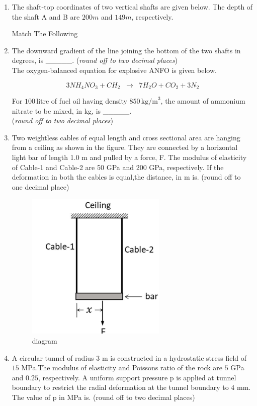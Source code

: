 \documentclass[journal,12pt,onecolumn]{IEEEtran}
\theoremstyle{remark}
\begin{document}
\begin{enumerate}
\hfill{}
\item The shaft-top coordinates of two vertical shafts are given below. The depth of the shaft A and B are $200 m$ and $149 m$, respectively.
\begin{table}[H]
  \centering
  \caption{Match The Following}
  
  \label{tab:table9}
\end{table}

\hfill{}
\item The downward gradient of the line joining the bottom of the two shafts in degrees, is \_\_\_\_\_. 
(\textit{round off to two decimal places}) \\[2em]


The oxygen-balanced equation for explosive ANFO is given below.  

\[
3NH_4NO_3 + CH_2 \;\; \rightarrow \;\; 7H_2O + CO_2 + 3N_2
\]

For $100 \, \text{litre}$ of fuel oil having density $850 \, \text{kg/m}^3$, the amount of ammonium nitrate 
to be mixed, in kg, is \_\_\_\_\_. \\
(\textit{round off to two decimal places})


\hfill{}
\item Two weightless cables of equal length and cross sectional area are hanging from a
ceiling as shown in the figure. They are connected by a horizontal light bar of length 1.0 m and pulled by a force, F. The modulus of elasticity of Cable-1 and Cable-2 are 50 GPa and 200 GPa, respectively. If the deformation in both the cables is equal,the distance, in m is. (round off to one decimal place) 
\begin{figure}[H]
  \centering
  \includegraphics[width=0.2\columnwidth]{figs/cab.png}
  \caption{diagram}
  \label{fig:4849}
\end{figure}
\item A circular tunnel of radius $3$ m is constructed in a hydrostatic stress field of $15$ MPa.The modulus of elasticity and Poissons ratio of the rock are $5$ GPa and $0.25$, respectively. A uniform support pressure p is applied at tunnel boundary to restrict
the radial deformation at the tunnel boundary to $4$ mm. The value of p in MPa is. (round off to two decimal places) 


\end{enumerate}
\end{document}
